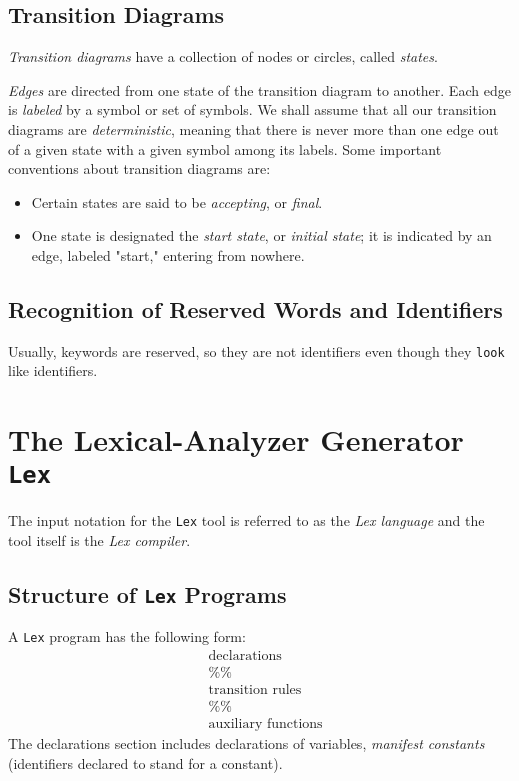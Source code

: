\documentclass[12pt,a4paper,twoside,openany]{book}
\begin{document}
\subsection{Transition Diagrams}

\textit{Transition diagrams} have a collection of nodes or circles, called \textit{states}.

\textit{Edges} are directed from one state of the transition diagram to another. Each edge is \textit{labeled} by a symbol or set of symbols. We shall assume that all our transition diagrams are \textit{deterministic}, meaning that there is never more than one edge out of a given state with a given symbol among its labels. Some important conventions about transition diagrams are:
\begin{itemize}
    \item Certain states are said to be \textit{accepting}, or \textit{final}.
    \item One state is designated the \textit{start state}, or \textit{initial state}; it is indicated by an edge, labeled "start," entering from nowhere.
\end{itemize}

\subsection{Recognition of Reserved Words and Identifiers}

Usually, keywords are reserved, so they are not identifiers even though they \verb|look| like identifiers.

\section{The Lexical-Analyzer Generator \texttt{Lex}}

The input notation for the \verb|Lex| tool is referred to as the \textit{Lex language} and the tool itself is the \textit{Lex compiler}.

\subsection{Structure of \texttt{Lex} Programs}

A \verb|Lex| program has the following form:
\begin{equation*}
    \begin{aligned}&\text{declarations}\\&\%\%\\&\text{transition rules}\\&\%\%\\&\text{auxiliary functions}\end{aligned}
\end{equation*}
The declarations section includes declarations of variables, \textit{manifest constants} (identifiers declared to stand for a constant).
\end{document}
